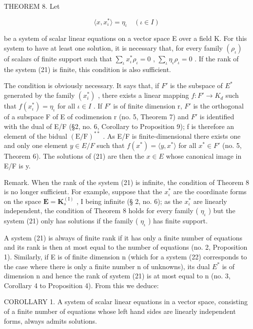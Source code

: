 THEOREM 8. Let

\[
\langle x, x _ {\iota} ^ {*} \rangle = \eta_ {\iota} \quad (\iota \in I)\tag{21}
\]

be a system of scalar linear equations on a vector space E over a field K. For this system to have at least one solution, it is necessary that, for every family \((\rho_{\iota})\) of scalars of finite support such that \(\sum_{\iota} x_{\iota}^{*}\rho_{\iota}=0\) , \(\sum_{\iota}\eta_{\iota}\rho_{\iota}=0\) . If the rank of the system (21) is finite, this condition is also sufficient.

The condition is obviously necessary. It says that, if \(F'\) is the subspace of \(E^{*}\) generated by the family \((x_{i}^{*})\) , there exists a linear mapping \(f:F'\to K_{d}\) such that \(f(x_{\iota}^{*})=\eta_{\iota}\) for all \(\iota\in I\) . If \(F'\) is of finite dimension r, \(F'\) is the orthogonal of a subspace F of E of codimension r (no. 5, Theorem 7) and \(F'\) is identified with the dual of E/F (§2, no. 6, Corollary to Proposition 9); f is therefore an element of the bidual \((\mathrm{E}/\mathrm{F})^{**}\) . As E/F is finite-dimensional there exists one and only one element \(y\in E/F\) such that \(f(x^{*})=\langle y,x^{*}\rangle\) for all \(x^{*}\in F'\) (no. 5, Theorem 6). The solutions of (21) are then the \(x\in E\) whose canonical image in E/F is y.

Remark. When the rank of the system (21) is infinite, the condition of Theorem 8 is no longer sufficient. For example, suppose that the \(x_{\iota}^{*}\) are the coordinate forms on the space \(\mathbf{E} = \mathbf{K}_{s}^{(\mathrm{I})}\) , I being infinite (§ 2, no. 6); as the \(x_{\iota}^{*}\) are linearly independent, the condition of Theorem 8 holds for every family ( \(\eta_{\iota}\) ) but the system (21) only has solutions if the family ( \(\eta_{\iota}\) ) has finite support.

A system (21) is always of finite rank if it has only a finite number of equations and its rank is then at most equal to the number of equations (no. 2, Proposition 1). Similarly, if E is of finite dimension n (which for a system (22) corresponds to the case where there is only a finite number n of unknowns), its dual \(E^{*}\) is of dimension n and hence the rank of system (21) is at most equal to n (no. 3, Corollary 4 to Proposition 4). From this we deduce:

COROLLARY 1. A system of scalar linear equations in a vector space, consisting of a finite number of equations whose left hand sides are linearly independent forms, always admits solutions.

